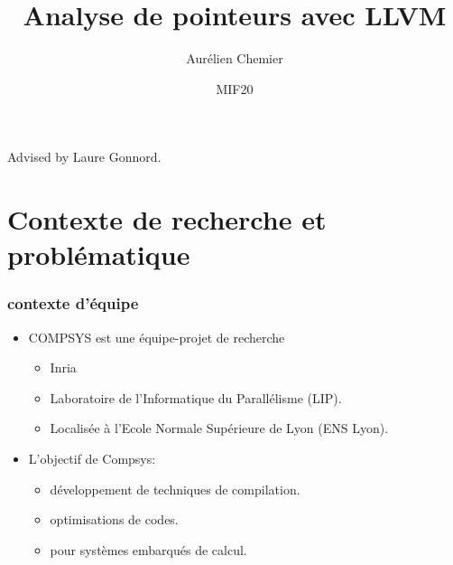 \title[C2C compiler]{Analyse de pointeurs avec LLVM}



\author[Aurélien Chemier]{Aurélien Chemier}
   
\date[Janvier-Février 2014]{MIF20}




\begin{frame}[plain]
   \titlepage

{\scriptsize Advised by Laure Gonnord. 
}
 \end{frame}

\begin{frame}[plain]
	\tableofcontents
\end{frame}

\section{Contexte de recherche et problématique}

\begin{frame}\frametitle{contexte d'équipe}

\begin{itemize}
  \item COMPSYS est une équipe-projet de recherche 
    \begin{itemize}
    \item Inria 
    \item Laboratoire de l'Informatique du Parallélisme (LIP).
    \item Localisée à l'Ecole Normale Supérieure de Lyon (ENS Lyon).
    \end{itemize}
  
  
  \item L'objectif de Compsys:
    \begin{itemize}
    \item développement de techniques de compilation.
    \item optimisations de codes.
    \item pour systèmes embarqués de calcul.
    \end{itemize}

  \end{itemize}

\end{frame}


